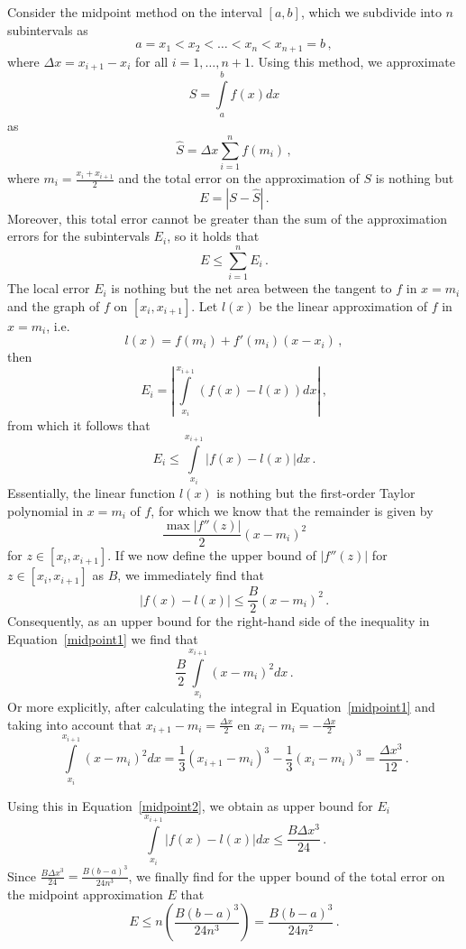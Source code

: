 \begin{Answer}
     Consider the midpoint method on the interval $[a,b]$, which we subdivide into $n$ subintervals as
    $$
    a=x_1<x_2<\ldots<x_n<x_{n+1}=b\,,
    $$
    where $\Delta x=x_{i+1}-x_i$ for all $i=1,\ldots,n+1$. Using this method, we approximate
    $$
    S=\int\limits_a^bf(x)dx
    $$
    as
    $$
    \hat{S}=\Delta x\sum_{i=1}^nf(m_i)\,,
    $$
    where $m_i=\frac{x_i+x_{i+1}}{2}$ and the total error on the approximation of $S$ is nothing but
    $$
    E=\left|S-\hat{S}\right|\,.
    $$
    Moreover, this total error cannot be greater than the sum of the approximation errors for the subintervals $E_i$, so it holds that
    $$
    E\leq\sum_{i=1}^n E_i\,.
    $$
    The local error $E_i$ is nothing but the net area between the tangent to $f$ in $x=m_i$ and the graph of $f$ on $[x_i,x_{i+1}]$. Let $l(x)$ be the linear approximation of $f$ in $x=m_i$, i.e.
    $$
    l(x)=f(m_i)+f'(m_i)(x-x_i)\,,
    $$
    then
    $$
    E_i=\left|\int\limits_{x_i}^{x_{i+1}}\left(f(x)-l(x)\right)dx\right|\,,
    $$
    from which it follows that
    \begin{equation}
    E_i \leq\int\limits_{x_i}^{x_{i+1}}\left|f(x)-l(x)\right|dx\,.
    \label{midpoint1}
    \end{equation}
    Essentially, the linear function $l(x)$ is nothing but the first-order Taylor polynomial in $x=m_i$ of $f$, for which we know that the remainder is given by 
    $$
    \dfrac{\max\left|f''(z)\right|}{2}(x-m_i)^2
    $$
    for $z\in[x_i,x_{i+1}]$. If we now define the upper bound of $\left|f''(z)\right|$ for $z\in[x_i,x_{i+1}]$ as $B$, we immediately find that
    $$
    \left|f(x)-l(x)\right|\leq\dfrac{B}{2}(x-m_i)^2\,.
    $$
    Consequently, as an upper bound for the right-hand side of the inequality in Equation~\eqref{midpoint1} we find that
    \begin{equation}
    \dfrac{B}{2}\int\limits_{x_i}^{x_{i+1}}(x-m_i)^2dx\,.
    \label{midpoint2}
    \end{equation}
    Or more explicitly, after calculating the integral in Equation~\ref{midpoint1} and taking into account that $x_{i+1}-m_i = \frac{\Delta x}{2}$ en $x_{i}-m_i = -\frac{\Delta x}{2}$
    $$
    \int\limits_{x_i}^{x_{i+1}}(x-m_i)^2dx=\dfrac{1}{3}(x_{i+1}-m_i)^3-\dfrac{1}{3}(x_{i}-m_i)^3 =\dfrac{\Delta x^3}{12}\,.
    $$
    
    Using this in Equation~\eqref{midpoint2}, we obtain as upper bound for $E_i$
    $$
    \int\limits_{x_i}^{x_{i+1}}\left|f(x)-l(x)\right|dx\leq\dfrac{B\Delta x^3}{24}\,.
    $$
    Since $\frac{B\Delta x^3}{24}=\frac{B(b-a)^3}{24n^3}$, we finally find for the upper bound of the total error on the midpoint approximation $E$ that
    $$
    E\leq n\left(\dfrac{B(b-a)^3}{24n^3}\right)=\dfrac{B(b-a)^3}{24n^2}\,.
    $$
\end{Answer}


